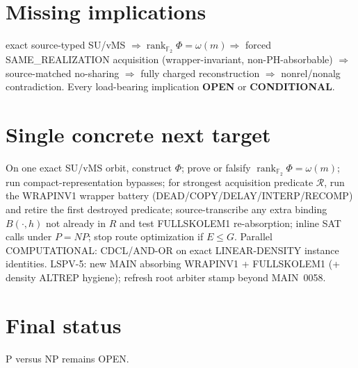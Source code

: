 \documentclass[11pt]{article}
\begin{document}
\section*{Missing implications}
exact source-typed SU/vMS $\Rightarrow\operatorname{rank}_{\mathbb F_2}\Phi=\omega(m)
\Rightarrow$ forced SAME\_REALIZATION acquisition (wrapper-invariant, non-PH-absorbable)
$\Rightarrow$ source-matched no-sharing $\Rightarrow$ fully charged reconstruction
$\Rightarrow$ nonrel/nonalg contradiction.
Every load-bearing implication \textbf{OPEN} or \textbf{CONDITIONAL}.

\section*{Single concrete next target}
On one exact SU/vMS orbit, construct $\Phi$; prove or falsify
$\boxed{\operatorname{rank}_{\mathbb F_2}\Phi=\omega(m)}$;
run compact-representation bypasses; for strongest acquisition predicate $\mathcal R$,
run the WRAPINV1 wrapper battery (DEAD/COPY/DELAY/INTERP/RECOMP) and retire the first
destroyed predicate; source-transcribe any extra binding $B(\cdot,h)$ not already in $R$ and
test FULLSKOLEM1 re-absorption; inline SAT calls under $P=NP$; stop route optimization if
$E\le G$. Parallel COMPUTATIONAL: CDCL/AND-OR on exact LINEAR-DENSITY instance identities.
LSPV-5: new MAIN absorbing WRAPINV1 + FULLSKOLEM1 (+ density ALTREP hygiene); refresh root
arbiter stamp beyond MAIN~0058.

\section*{Final status}
P versus NP remains OPEN.

\end{document}
